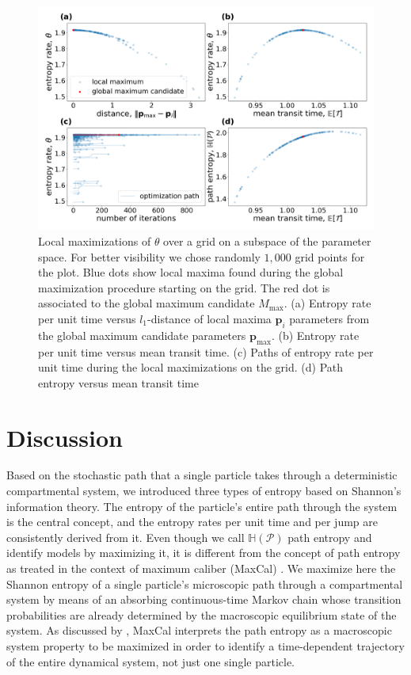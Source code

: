 \documentclass[smallextended]{svjour3}
\renewcommand{\vec}[1]{\mathbf{#1}}
\renewcommand{\H}{\mathbb{H}}
\begin{document}
	\begin{figure}[ht]
    \centering
    \includegraphics[width=0.95\linewidth]{figs/model_id.png}
	\caption{
		Local maximizations of $\theta$ over a grid on a subspace of the parameter space. For better visibility we chose randomly $1,000$ grid points for the plot. Blue dots show local maxima found during the global maximization procedure starting on the grid. 
		The red dot is associated to the global maximum candidate $M_{\text{max}}$.
		(a) Entropy rate per unit time versus $l_1$-distance of local maxima $\vec{p}_i$ parameters from the global maximum candidate parameters $\vec{p}_{\text{max}}$.
		(b) Entropy rate per unit time versus mean transit time.
		(c) Paths of entropy rate per unit time during the local maximizations on the grid.
		(d) Path entropy versus mean transit time 
    }
		\label{fig:model_id}
    \end{figure}



\section{Discussion}
Based on the stochastic path that a single particle takes through a deterministic compartmental system, we introduced three types of entropy based on Shannon's information theory.
The entropy of the particle's entire path through the system is the central concept, and the entropy rates per unit time and per jump are consistently derived from it.
Even though we call $\H(\mathcal{P})$ path entropy and identify models by maximizing it, it is different from the concept of path entropy as treated in the context of maximum caliber (MaxCal) \citep{jaynes1985macroscopic, Roach2020}.
We maximize here the Shannon entropy of a single particle's microscopic path through a compartmental system by means of an absorbing continuous-time Markov chain whose transition probabilities are already determined by the macroscopic equilibrium state of the system.
As discussed by \citet{Presse2013RMP}, MaxCal interprets the path entropy as a macroscopic system property to be maximized in order to identify a time-dependent trajectory of the entire dynamical system, not just one single particle.
\end{document}
